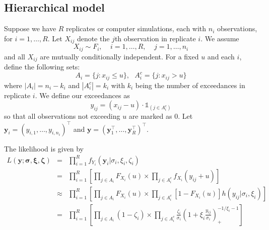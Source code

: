 \documentclass[12pt]{article}
\newcommand{\m}[1]{\mathbf{\bm{#1}}}
\newcommand{\ind}{\mathds{1}}
\newcommand{\m}[1]{\mathbf{\bm{#1}}}
\begin{document}

\subsection{Hierarchical model}
\label{hier}

Suppose we have $R$ replicates or computer simulations, each with $n_i$ observations, for $i=1,\ldots,R$. Let $X_{ij}$ denote the $j$th observation in replicate $i$. We assume
\[ X_{ij} \sim F_i,~~~~~i=1,\ldots,R,~~~~~j=1,\ldots,n_i \]
and all $X_{ij}$ are mutually conditionally independent. For a fixed $u$ and each $i$, define the following sets:
\[ A_i = \{j:x_{ij}\leq u\},~~~ A_i^c = \{j: x_{ij}>u\} \]
where $|A_i|=n_i-k_i$ and $|A_i^c|=k_i$ with $k_i$ being the number of exceedances in replicate $i$. We define our exceedances as
\[ y_{ij} = (x_{ij}-u)\cdot \ind_{(j \in A_i^c)} \]
so that all observations not exceeding $u$ are marked as $0$. Let $\m{y}_i=(y_{i,1},\ldots,y_{i,n_i})^\top$ and $\m{y}=(\m{y}_1^\top,\ldots,\m{y}_R^\top)^\top$.
\bigskip

\noindent The likelihood is given by
\begin{eqnarray*}
L(\m{y}; \m{\sigma}, \m{\xi}, \m{\zeta}) &=& \prod_{i=1}^R f_{Y_i}(\m{y}_i|\sigma_i,\xi_i,\zeta_i) \\
&=& \prod_{i=1}^R\left[\prod_{j\in A_i} F_{X_i}(u) \times \prod_{j\in A_i^c} f_{X_i}(y_{ij}+u)\right] \\
&\approx& \prod_{i=1}^R\left[\prod_{j\in A_i} F_{X_i}(u) \times \prod_{j\in A_i^c} [1-F_{X_i}(u)]h(y_{ij}|\sigma_i,\xi_i)\right] \\
&=& \prod_{i=1}^R\left[\prod_{j\in A_i} (1-\zeta_i)\times \prod_{j\in A_i^c} \frac{\zeta_i}{\sigma_i}\left(1+\xi_i\frac{y_{ij}}{\sigma_i}\right)_+^{-1/\xi_i-1}\right] \\
\end{eqnarray*}
\end{document}
